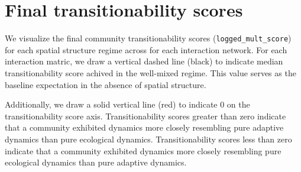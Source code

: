 \documentclass[
]{book}
\begin{document}
\hypertarget{final-transitionability-scores}{%
\section{Final transitionability scores}\label{final-transitionability-scores}}

We visualize the final community transitionability scores (\texttt{logged\_mult\_score}) for each spatial structure regime across for each interaction network.
For each interaction matric, we draw a vertical dashed line (black) to indicate median transitionability score achived in the well-mixed regime.
This value serves as the baseline expectation in the absence of spatial structure.

Additionally, we draw a solid vertical line (red) to indicate 0 on the transitionability score axis.
Transitionability scores greater than zero indicate that a community exhibited dynamics more closely resembling pure adaptive dynamics than pure ecological dynamics.
Transitionability scores less than zero indicate that a community exhibited dynamics more closely resembling pure ecological dynamics than pure adaptive dynamics.
\end{document}
